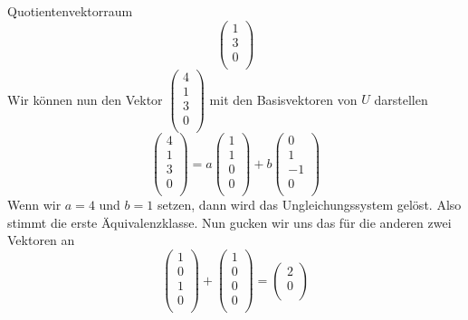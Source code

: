\begin{Beispiel}{Quotientenvektorraum}
$$\begin{pmatrix}
        1 \\
        3 \\
        0 \\
    \end{pmatrix}$$
    Wir können nun den Vektor $\begin{pmatrix}
        4 \\
        1 \\
        3 \\
        0 \\
    \end{pmatrix}$ mit den Basisvektoren von $U$ darstellen
    $$\begin{pmatrix}
        4 \\
        1 \\
        3 \\
        0 \\
    \end{pmatrix}= a \begin{pmatrix}
        1 \\
        1 \\
        0 \\
        0 \\
    \end{pmatrix}+b\begin{pmatrix}
        0 \\
        1 \\
        -1 \\
        0 \\
    \end{pmatrix}$$
    Wenn wir $a=4$ und $b=1$ setzen, dann wird das Ungleichungssystem gelöst. Also stimmt die erste Äquivalenzklasse. Nun gucken wir uns das für die anderen zwei Vektoren an
    $$\begin{pmatrix}
        1 \\
        0 \\
        1 \\
        0 \\
    \end{pmatrix}+\begin{pmatrix}
        1 \\
        0 \\
        0 \\
        0 \\
    \end{pmatrix}=\begin{pmatrix}
        2 \\
        0 \\

\end{pmatrix}$$
\end{Beispiel}
